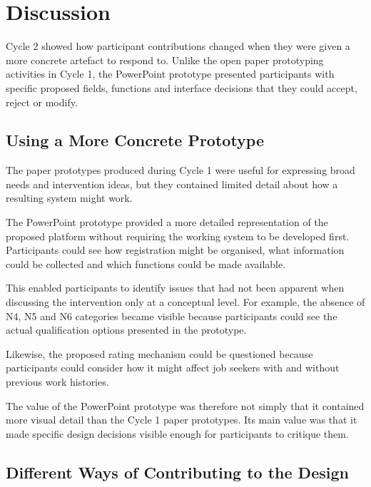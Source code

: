 \section{Discussion}

Cycle 2 showed how participant contributions changed when they were given a more concrete artefact to respond to. Unlike the open paper prototyping activities in Cycle 1, the PowerPoint prototype presented participants with specific proposed fields, functions and interface decisions that they could accept, reject or modify.


\subsection{Using a More Concrete Prototype}

The paper prototypes produced during Cycle 1 were useful for expressing broad needs and intervention ideas, but they contained limited detail about how a resulting system might work.

The PowerPoint prototype provided a more detailed representation of the proposed platform without requiring the working system to be developed first. Participants could see how registration might be organised, what information could be collected and which functions could be made available.

This enabled participants to identify issues that had not been apparent when discussing the intervention only at a conceptual level. For example, the absence of N4, N5 and N6 categories became visible because participants could see the actual qualification options presented in the prototype.

Likewise, the proposed rating mechanism could be questioned because participants could consider how it might affect job seekers with and without previous work histories.

The value of the PowerPoint prototype was therefore not simply that it contained more visual detail than the Cycle 1 paper prototypes. Its main value was that it made specific design decisions visible enough for participants to critique them.


\subsection{Different Ways of Contributing to the Design}

